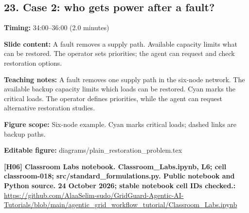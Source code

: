 \documentclass[10pt,letterpaper]{article}
\begin{document}
\subsection*{23. Case 2: who gets power after a fault?}
\textbf{Timing:} 34:00--36:00 (2.0 minutes)\par
\textbf{Slide content:} A fault removes a supply path. Available capacity limits what can be restored.
The operator sets priorities; the agent can request and check restoration options.\par
\textbf{Teaching notes:} A fault removes one supply path in the six-node network. The available backup capacity limits which loads can be restored. Cyan marks the critical loads. The operator defines priorities, while the agent can request alternative restoration studies.\par
\textbf{Figure scope:} Six-node example. Cyan marks critical loads; dashed links are backup paths.\par
\textbf{Editable figure:} diagrams/plain\_restoration\_problem.tex\par
\textbf{[H06] Classroom Labs notebook. Classroom\_Labs.ipynb, L6; cell classroom-018; src/standard\_formulations.py. Public notebook and Python source. 24 October 2026; stable notebook cell IDs checked.:} \href{https://github.com/AlaaSelim-sudo/GridGuard-Agentic-AI-Tutorials/blob/main/agentic_grid_workflow_tutorial/Classroom_Labs.ipynb}{\small\ttfamily https:/\allowbreak{}/\allowbreak{}github.\allowbreak{}com/\allowbreak{}AlaaSelim-\allowbreak{}sudo/\allowbreak{}GridGuard-\allowbreak{}Agentic-\allowbreak{}AI-\allowbreak{}Tutorials/\allowbreak{}blob/\allowbreak{}main/\allowbreak{}agentic\_\allowbreak{}grid\_\allowbreak{}workflow\_\allowbreak{}tutorial/\allowbreak{}Classroom\_\allowbreak{}Labs.\allowbreak{}ipynb}\par
\par\medskip
\end{document}
